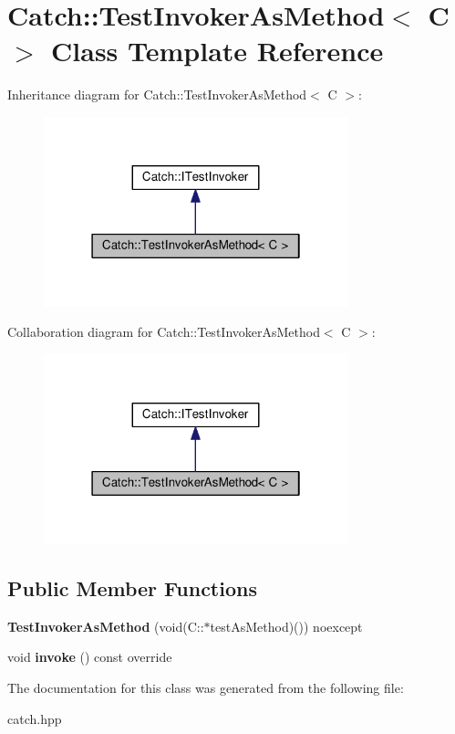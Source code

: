 \hypertarget{classCatch_1_1TestInvokerAsMethod}{}\section{Catch\+:\+:Test\+Invoker\+As\+Method$<$ C $>$ Class Template Reference}
\label{classCatch_1_1TestInvokerAsMethod}


Inheritance diagram for Catch\+:\+:Test\+Invoker\+As\+Method$<$ C $>$\+:\nopagebreak
\begin{figure}[H]
\begin{center}
\leavevmode
\includegraphics[width=250pt]{classCatch_1_1TestInvokerAsMethod__inherit__graph}
\end{center}
\end{figure}


Collaboration diagram for Catch\+:\+:Test\+Invoker\+As\+Method$<$ C $>$\+:\nopagebreak
\begin{figure}[H]
\begin{center}
\leavevmode
\includegraphics[width=250pt]{classCatch_1_1TestInvokerAsMethod__coll__graph}
\end{center}
\end{figure}
\subsection*{Public Member Functions}
\begin{DoxyCompactItemize}
\item 
{\bfseries Test\+Invoker\+As\+Method} (void(C\+::$\ast$test\+As\+Method)()) noexcept\hypertarget{classCatch_1_1TestInvokerAsMethod_a119c4bdbbdd95c42859c18541987a1a4}{}\label{classCatch_1_1TestInvokerAsMethod_a119c4bdbbdd95c42859c18541987a1a4}

\item 
void {\bfseries invoke} () const override\hypertarget{classCatch_1_1TestInvokerAsMethod_a8115a06efe273f4112ec0b5452c1b5f2}{}\label{classCatch_1_1TestInvokerAsMethod_a8115a06efe273f4112ec0b5452c1b5f2}

\end{DoxyCompactItemize}


The documentation for this class was generated from the following file\+:\begin{DoxyCompactItemize}
\item 
catch.\+hpp\end{DoxyCompactItemize}
